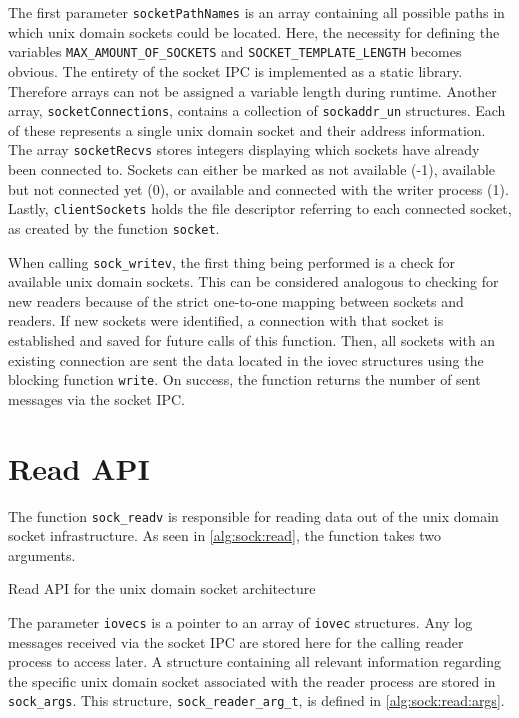 The first parameter \texttt{socketPathNames} is an array containing all possible paths in which unix domain sockets could be located.
Here, the necessity for defining the variables \texttt{MAX\_AMOUNT\_OF\_SOCKETS} and \texttt{SOCKET\_TEMPLATE\_LENGTH} becomes obvious.
The entirety of the socket IPC is implemented as a static library.
Therefore arrays can not be assigned a variable length during runtime.
Another array, \texttt{socketConnections}, contains a collection of \texttt{sockaddr\_un} structures.
Each of these represents a single unix domain socket and their address information.
The array \texttt{socketRecvs} stores integers displaying which sockets have already been connected to.
Sockets can either be marked as not available (-1), available but not connected yet (0), or available and connected with the writer process (1).
Lastly, \texttt{clientSockets} holds the file descriptor referring to each connected socket, as created by the function \texttt{socket}.

When calling \texttt{sock\_writev}, the first thing being performed is a check for available unix domain sockets.
This can be considered analogous to checking for new readers because of the strict one-to-one mapping between sockets and readers.
If new sockets were identified, a connection with that socket is established and saved for future calls of this function.
Then, all sockets with an existing connection are sent the data located in the iovec structures using the blocking function \texttt{write}.
On success, the function returns the number of sent messages via the socket IPC.

\section{Read API}
The function \texttt{sock\_readv} is responsible for reading data out of the unix domain socket infrastructure.
As seen in \ref{alg:sock:read}, the function takes two arguments.

\begin{algorithm}[h!]
    
    \caption[Socket: Read API]{Read API for the unix domain socket architecture}
    \label{alg:sock:read}
\end{algorithm}

The parameter \texttt{iovecs} is a pointer to an array of \texttt{iovec} structures.
Any log messages received via the socket IPC are stored here for the calling reader process to access later.
A structure containing all relevant information regarding the specific unix domain socket associated with the reader process are stored in \texttt{sock\_args}.
This structure, \texttt{sock\_reader\_arg\_t}, is defined in \ref{alg:sock:read:args}.

